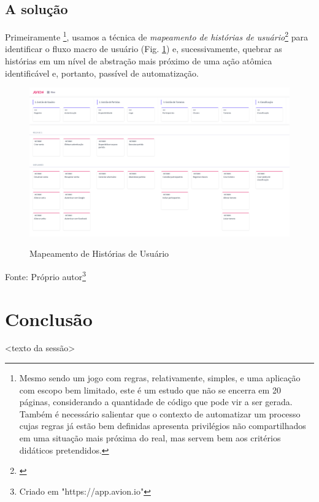 \documentclass[12pt,a4paper,oneside,english,brazil]{article}
\begin{document}
    \subsection{A solução}

      Primeiramente
      \footnote{Mesmo sendo um jogo com regras, relativamente,
      simples, e uma aplicação com escopo bem limitado, este é um estudo que não
      se encerra em 20 páginas, considerando a quantidade de código que pode vir
      a ser gerada. Também é necessário salientar que o contexto de automatizar
      um processo cujas regras já estão bem definidas apresenta privilégios não
      compartilhados em uma situação mais próxima do real, mas servem bem aos
      critérios didáticos pretendidos.},
      usamos a técnica de \emph{mapeamento de histórias de usuário}\footnote{
      \cite{Patton2014}} para identificar o fluxo macro de usuário (Fig.
      \ref{fig:fluxogeral}) e, sucessivamente, quebrar as histórias em um nível
      de abstração mais próximo de uma ação atômica identificável e, portanto,
      passível de automatização.

      \begin{center}
        \begin{figure}[h]
          \centering
          \caption{Mapeamento de Histórias de Usuário}
          \includegraphics[width=16cm]{user-stories-mapping}
          \label{fig:fluxogeral}
        \end{figure}
        Fonte: Próprio autor\footnote{Criado em "https://app.avion.io"}
      \end{center}

      

  \section{Conclusão}

    <texto da sessão>

  \clearpage

  \renewcommand\refname{Referências Bibliográficas}

    
    
\end{document}
